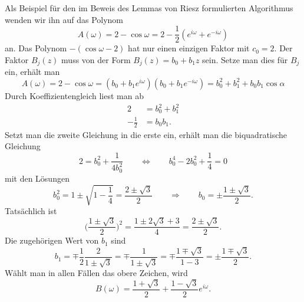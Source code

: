 \begin{beispiel}
\label{buch:kompakt:db2riesz}
Als Beispiel für den im Beweis des Lemmas von Riesz formulierten Algorithmus
wenden wir ihn auf das Polynom
\[
A(\omega)
=
2-\cos\omega
=
2-\frac12(e^{i\omega}+e^{-i\omega})
\]
an.
Das Polynom $-(\cos\omega -2)$ hat nur einen einzigen Faktor mit $c_0=2$.
Der Faktor $B_j(z)$ muss von der Form $B_j(z)=b_0+b_1z$ sein.
Setze man dies für $B_j$ ein, erhält man
\[
A(\omega)
=
2-\cos\omega
=
(b_0+b_1e^{i\omega})
(b_0+b_1e^{-i\omega})
=
b_0^2 + b_1^2 +b_0b_1\cos\alpha 
\]
Durch Koeffizientengleich liest man ab
\begin{align*}
2&=b_0^2 + b_1^2
\\
-\frac12&=b_0b_1.
\end{align*}
Setzt man die zweite Gleichung in die erste ein, erhält man die biquadratische
Gleichung
\[
2=b_0^2 + \frac{1}{4b_0^2}
\qquad\Leftrightarrow\qquad
b_0^4-2b_0^2 + \frac14 = 0
\]
mit den Lösungen
\[
b_0^2 = 1\pm \sqrt{1-\frac14} = \frac{2\pm\sqrt{3}}{2}
\qquad\Rightarrow\qquad
b_0 = \pm \frac{1\pm\sqrt{3}}2.
\]
Tatsächlich ist
\[
\biggl(
\frac{1\pm\sqrt{3}}2
\biggr)^2
=
\frac{1\pm 2\sqrt{3}+3}{4}
=
\frac{2\pm\sqrt{3}}2.
\]
Die zugehörigen Wert von $b_1$ sind
\[
b_1
=
\mp
\frac{1}{2}\frac{2}{1\pm\sqrt{3}}
=
\mp
\frac{1}{1\pm\sqrt{3}}
=
\mp
\frac{1\mp \sqrt{3}}{1-3}
=
\pm
\frac{1\mp\sqrt{3}}{2}.
\]
Wählt man in allen Fällen das obere Zeichen, wird
\[
B(\omega)
= 
\frac{1+\sqrt{3}}2 + \frac{1-\sqrt{3}}2 e^{i\omega}.
\]
\end{beispiel}


